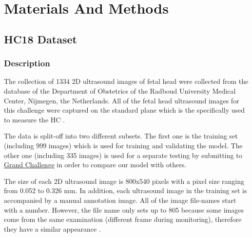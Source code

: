 \chapter{Materials And Methods}
\section{HC18 Dataset}
\subsection{Description}
\label{subsection:dataset}
\noindent

	The collection of 1334 2D ultrasound images of fetal head were collected from the database of the Department of Obstetrics of the Radboud University Medical Center, Nijmegen, the Netherlands. All of the fetal head ultrasound images for this challenge were captured on the standard plane which is the specifically used to measure the HC \cite{thomas}.
	
	The data is split-off into two different subsets. The first one is the training set (including 999 images) which is used for training and validating the model. The other one (including 335 images) is used for a separate testing by submitting to \href{https://hc18.grand-challenge.org/}{Grand Challenge} in order to compare our model with others.
	
	
	The size of each 2D ultrasound image is 800x540 pixels with a pixel size ranging from 0.052 to 0.326 mm. In addition, each ultrasound image in the training set is accompanied by a manual annotation image. All of the image file-names start with a number. However, the file name only sets up to 805 because some images come from the same examination (different frame during monitoring), therefore they have a similar appearance \cite{thomas}.
	
